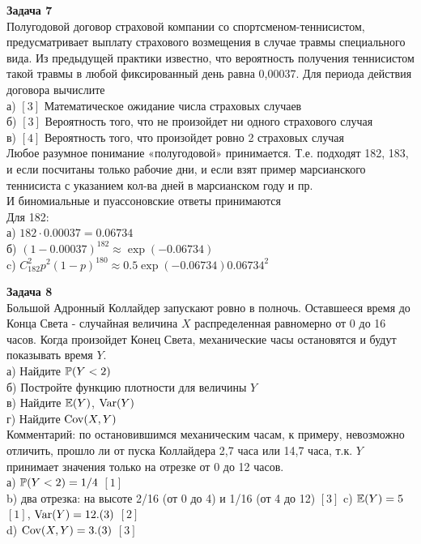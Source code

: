 \documentclass[12pt, a4paper]{article}\usepackage[]{graphicx}\usepackage[]{color}
\begin{document}
\textbf{Задача 7} \\ %
Полугодовой договор страховой компании со спортсменом-теннисистом, предусматривает выплату страхового возмещения  в случае травмы специального вида. Из предыдущей практики известно, что вероятность получения теннисистом такой травмы  в любой фиксированный день равна 0,00037. Для периода действия договора вычислите \\
а) $[3]$ Математическое ожидание числа страховых случаев \\
б) $[3]$ Вероятность того, что не произойдет ни одного страхового случая \\
в) $[4]$ Вероятность того, что произойдет ровно 2 страховых случая \\
Любое разумное понимание «полугодовой» принимается. Т.е. подходят 182, 183, и если посчитаны только рабочие дни, и если взят пример марсианского теннисиста с указанием кол-ва дней в марсианском году и пр. \\
И биномиальные и пуассоновские ответы принимаются \\
Для 182: \\
а) $182\cdot 0.00037=0.06734$  \\
б) $(1-0.00037)^182\approx \exp(-0.06734)$ \\
c) $C_{182}^{2}p^{2}(1-p)^{180}\approx 0.5\exp(-0.06734)0.06734^2$



\textbf{Задача 8} \\
Большой Адронный Коллайдер запускают ровно в полночь. Оставшееся время до Конца Света - случайная величина $X$ распределенная равномерно от 0 до 16 часов. Когда произойдет Конец Света, механические часы остановятся и будут показывать время $Y$. \\
а) Найдите $\P(Y<2)$ \\
б) Постройте функцию плотности для величины $Y$ \\
в) Найдите $\E(Y)$, $\Var(Y)$\\
г) Найдите $\Cov(X,Y)$ \\
Комментарий: по остановившимся механическим часам, к примеру, невозможно отличить, прошло ли от пуска Коллайдера 2,7 часа или 14,7 часа, т.к. $Y$ принимает значения только на отрезке от 0 до 12 часов. \\
а) $\P(Y<2)=1/4$ $[1]$ \\
b) два отрезка: на высоте 2/16 (от 0 до 4) и 1/16 (от 4 до 12) $[3]$
c) $\E(Y)=5$ $[1]$, $\Var(Y)=12.(3)$ $[2]$ \\
d) $\Cov(X,Y)=3.(3)$ $[3]$ \\
\end{document}
